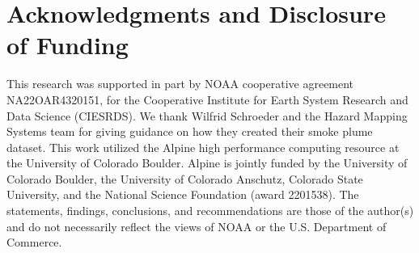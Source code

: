 \documentclass{article}
\begin{document}
\section{Acknowledgments and Disclosure of Funding}

This research was supported in part by NOAA cooperative agreement NA22OAR4320151, for the Cooperative Institute for Earth System Research and Data Science (CIESRDS). We thank Wilfrid Schroeder and the Hazard Mapping Systems team for giving guidance on how they created their smoke plume dataset. This work utilized the Alpine high performance computing resource at the University of Colorado Boulder. Alpine is jointly funded by the University of Colorado Boulder, the University of Colorado Anschutz, Colorado State University, and the National Science Foundation (award 2201538). The statements, findings, conclusions, and recommendations are those of the author(s) and do not necessarily reflect the views of NOAA or the U.S. Department of Commerce. 


\end{document}
